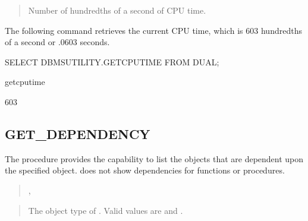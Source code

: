 \documentclass[letterpaper,10pt,english,openany,oneside]{sphinxmanual}
\begin{document}

\begin{quote}

Number of hundredths of a second of CPU time.
\end{quote}


The following  command retrieves the current CPU time, which is
603 hundredths of a second or .0603 seconds.

%
\begin{sphinxVerbatim}[commandchars=\\\{\}]
SELECT DBMS\PYGZus{}UTILITY.GET\PYGZus{}CPU\PYGZus{}TIME FROM DUAL;

get\PYGZus{}cpu\PYGZus{}time

\PYGZhy{}\PYGZhy{}\PYGZhy{}\PYGZhy{}\PYGZhy{}\PYGZhy{}\PYGZhy{}\PYGZhy{}\PYGZhy{}\PYGZhy{}\PYGZhy{}\PYGZhy{}\PYGZhy{}\PYGZhy{}

        603
\end{sphinxVerbatim}

\newpage


\subsection{GET\_DEPENDENCY}
\label{\detokenize{dbms_utility:get-dependency}}
The  procedure provides the capability to list the
objects that are dependent upon the specified object. 
does not show dependencies for functions or procedures.
\begin{quote}

,
\begin{quote}

\end{quote}
\end{quote}


\begin{quote}

The object type of . Valid values are  and .
\end{quote}
\end{document}
